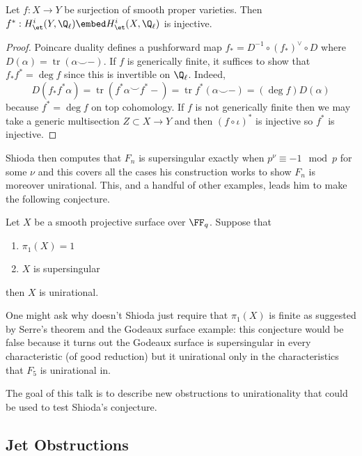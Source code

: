 \documentclass[12pt]{article}
\renewcommand{\tr}{\operatorname{tr}}
\begin{document}
\begin{lemma}
Let $f : X \to Y$ be surjection of smooth proper varieties. Then $f^* : H^i_{\et}(Y, \Q_\ell) \embed H^i_{\et}(X, \Q_\ell)$ is injective.
\end{lemma}

\begin{proof}
Poincare duality defines a pushforward map $f_* = D^{-1} \circ (f_*)^{\vee} \circ D$ where $D(\alpha) = \tr{(\alpha \smile -)}$. If $f$ is generically finite, it suffices to show that $f_* f^* = \deg{f}$ since this is invertible on $\Q_\ell$. Indeed, 
\[ D(f_* f^* \alpha) = \tr{(f^* \alpha \smile f^* - )} = \tr{f^* (\alpha \smile -)} = (\deg{f}) D(\alpha) \]
because $f^* = \deg{f}$ on top cohomology. If $f$ is not generically finite then we may take a generic multisection $Z \subset X \to Y$ and then $(f \circ \iota)^*$ is injective so $f^*$ is injective.
\end{proof}

Shioda then computes that $F_n$ is supersingular exactly when $p^\nu \equiv - 1 \mod p$ for some $\nu$ and this covers all the cases his construction works to show $F_n$ is moreover unirational. This, and a handful of other examples, leads him to make the following conjecture.

\begin{conj}[Shioda]
Let $X$ be a smooth projective surface over $\FF_q$. Suppose that
\begin{enumerate}
\item $\pi_1(X) = 1$
\item $X$ is supersingular
\end{enumerate}
then $X$ is unirational.
\end{conj}

\begin{rmk}
One might ask why doesn't Shioda just require that $\pi_1(X)$ is finite as suggested by Serre's theorem and the Godeaux surface example: this conjecture would be false because it turns out the Godeaux surface is supersingular in every characteristic (of good reduction) but it unirational only in the characteristics that $F_5$ is unirational in.
\end{rmk}

The goal of this talk is to describe new obstructions to unirationality that could be used to test Shioda's conjecture.

\subsection{Jet Obstructions}
\end{document}
